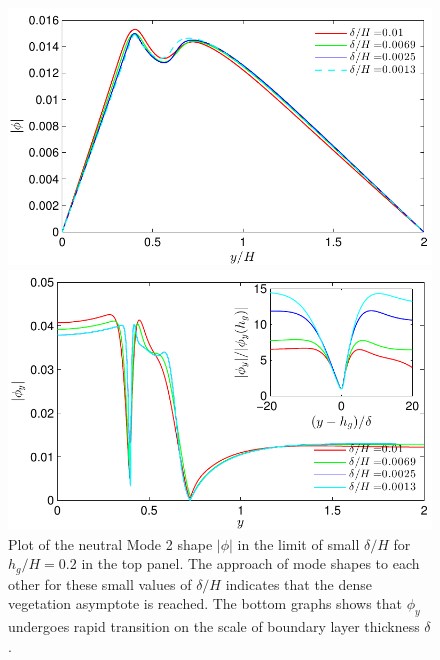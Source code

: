 \documentclass[12pt]{report}   %
\newcommand{\hg}{h_g}
\begin{document}
\begin{figure}
 \centerline{\includegraphics{IsotropicAsymptoticNoshear}} 
 \centerline{\includegraphics{IsotropicAsymptoticPhiyNoshear}}
 \caption [ Plot of the neutral Mode 2 shape $|\phi|$ in the limit of small $\delta/H$ for $\hg/H=0.2$ ] {
Plot of the neutral Mode 2 shape $|\phi|$ in the limit of small $\delta/H$ for $\hg/H=0.2$ in the top panel.
The approach of mode shapes to each other for these small values of $\delta/H$ indicates that the dense vegetation asymptote is reached. 
The bottom graphs shows that $\phi_y$ undergoes rapid transition on the scale of boundary layer thickness $\delta$.
}
\label{IsotropicAsymptotic_mode}
\end{figure}
\end{document}
